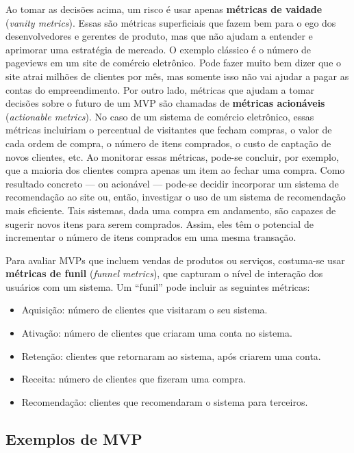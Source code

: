 \documentclass[
  11pt,
  twoside]{book}
\begin{document}
 Ao tomar as
decisões acima, um risco é usar apenas \textbf{métricas de vaidade}
(\emph{vanity metrics}). Essas são métricas superficiais que fazem bem
para o ego dos desenvolvedores e gerentes de produto, mas que não ajudam
a entender e aprimorar uma estratégia de mercado. O exemplo clássico é o
número de pageviews em um site de comércio eletrônico. Pode fazer muito
bem dizer que o site atrai milhões de clientes por mês, mas somente isso
não vai ajudar a pagar as contas do empreendimento. Por outro lado,
métricas que ajudam a tomar decisões sobre o futuro de um MVP são
chamadas de \textbf{métricas acionáveis} (\emph{actionable metrics}). No
caso de um sistema de comércio eletrônico, essas métricas incluiriam o
percentual de visitantes que fecham compras, o valor de cada ordem de
compra, o número de itens comprados, o custo de captação de novos
clientes, etc. Ao monitorar essas métricas, pode-se concluir, por
exemplo, que a maioria dos clientes compra apenas um item ao fechar uma
compra. Como resultado concreto --- ou acionável --- pode-se decidir
incorporar um sistema de recomendação ao site ou, então, investigar o
uso de um sistema de recomendação mais eficiente. Tais sistemas, dada
uma compra em andamento, são capazes de sugerir novos itens para serem
comprados. Assim, eles têm o potencial de incrementar o número de itens
comprados em uma mesma transação.

 Para avaliar MVPs
que incluem vendas de produtos ou serviços, costuma-se usar
\textbf{métricas de funil} (\emph{funnel metrics}), que capturam o nível
de interação dos usuários com um sistema. Um ``funil'' pode incluir as
seguintes métricas:

\begin{itemize}
\item
  Aquisição: número de clientes que visitaram o seu sistema.
\item
  Ativação: número de clientes que criaram uma conta no sistema.
\item
  Retenção: clientes que retornaram ao sistema, após criarem uma conta.
\item
  Receita: número de clientes que fizeram uma compra.
\item
  Recomendação: clientes que recomendaram o sistema para terceiros.
\end{itemize}

\hypertarget{exemplos-de-mvp}{%
\subsection{Exemplos de MVP}\label{exemplos-de-mvp}}
\end{document}
